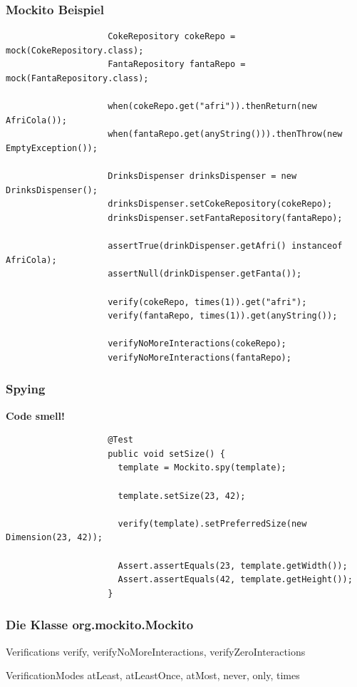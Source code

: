 \documentclass{beamer}
\begin{document}
			\begin{frame}[fragile]
				\frametitle{Mockito Beispiel}

				\begin{lstlisting}
					CokeRepository cokeRepo = mock(CokeRepository.class);
					FantaRepository fantaRepo = mock(FantaRepository.class);

					when(cokeRepo.get("afri")).thenReturn(new AfriCola());
					when(fantaRepo.get(anyString())).thenThrow(new EmptyException());

					DrinksDispenser drinksDispenser = new DrinksDispenser();
					drinksDispenser.setCokeRepository(cokeRepo);
					drinksDispenser.setFantaRepository(fantaRepo);

					assertTrue(drinkDispenser.getAfri() instanceof AfriCola);
					assertNull(drinkDispenser.getFanta());

					verify(cokeRepo, times(1)).get("afri");
					verify(fantaRepo, times(1)).get(anyString());

					verifyNoMoreInteractions(cokeRepo);
					verifyNoMoreInteractions(fantaRepo);
				\end{lstlisting}
			\end{frame}

			\begin{frame}[fragile]
				\frametitle{Spying}

				\color{red}\textbf{Code smell!}
				\color{black}
				\begin{lstlisting}
					@Test
					public void setSize() {
					  template = Mockito.spy(template);

					  template.setSize(23, 42);

					  verify(template).setPreferredSize(new Dimension(23, 42));

					  Assert.assertEquals(23, template.getWidth());
					  Assert.assertEquals(42, template.getHeight());
					}
				\end{lstlisting}
			\end{frame}

			\begin{frame}
				\frametitle{Die Klasse org.mockito.Mockito}

				\begin{block}{Verifications}
				verify, verifyNoMoreInteractions, verifyZeroInteractions
				\end{block}

				\begin{block}{VerificationModes}
				atLeast, atLeastOnce, atMost, never, only, times
				\end{block}
			\end{frame}
\end{document}
